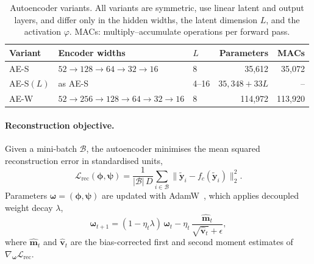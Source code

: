 \begin{table}[t]
  \centering
  \caption{Autoencoder variants. All variants are symmetric, use linear latent and output layers, and differ only in the hidden widths, the latent dimension $L$, and the activation $\varphi$. MACs: multiply--accumulate operations per forward pass.}
  \label{tab:arch}
  \begin{tabular}{lllrr}
    \toprule
    Variant & Encoder widths & $L$ & Parameters & MACs \\
    \midrule
    AE-S          & $52\!\rightarrow\!128\!\rightarrow\!64\!\rightarrow\!32\!\rightarrow\!16$                  & 8      & 35{,}612  & 35{,}072 \\
    AE-S$(L)$     & as AE-S                                                                                    & 4--16  & $35{,}348+33L$ & -- \\
    AE-W          & $52\!\rightarrow\!256\!\rightarrow\!128\!\rightarrow\!64\!\rightarrow\!32\!\rightarrow\!16$ & 8      & 114{,}972 & 113{,}920 \\
    \bottomrule
  \end{tabular}
\end{table}

\paragraph{Reconstruction objective.}
Given a mini-batch $\mathcal{B}$, the autoencoder minimises the mean squared reconstruction error in standardised units,
\begin{equation}
  \mathcal{L}_{\mathrm{rec}}(\bm{\phi},\bm{\psi}) = \frac{1}{|\mathcal{B}|\,D}\sum_{i\in\mathcal{B}}\bigl\lVert\tilde{\mathbf{y}}_i - f_c(\tilde{\mathbf{y}}_i)\bigr\rVert_2^{2}.
  \label{eq:lrec}
\end{equation}
Parameters $\bm{\omega}=(\bm{\phi},\bm{\psi})$ are updated with AdamW~\cite{TODO_loshchilov_adamw}, which applies decoupled weight decay $\lambda$,
\begin{equation}
  \bm{\omega}_{t+1} = (1-\eta_t\lambda)\,\bm{\omega}_t - \eta_t\,\frac{\hat{\mathbf{m}}_t}{\sqrt{\hat{\mathbf{v}}_t}+\epsilon},
  \label{eq:adamw}
\end{equation}
where $\hat{\mathbf{m}}_t$ and $\hat{\mathbf{v}}_t$ are the bias-corrected first and second moment estimates of $\nabla_{\bm{\omega}}\mathcal{L}_{\mathrm{rec}}$.

